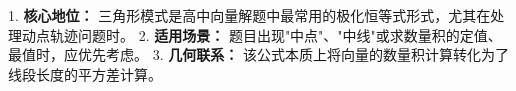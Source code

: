 \begin{summarybox}
1. \textbf{核心地位：} 三角形模式是高中向量解题中最常用的极化恒等式形式，尤其在处理动点轨迹问题时。
2. \textbf{适用场景：} 题目出现"中点"、"中线"或求数量积的定值、最值时，应优先考虑。
3. \textbf{几何联系：} 该公式本质上将向量的数量积计算转化为了线段长度的平方差计算。
\end{summarybox}